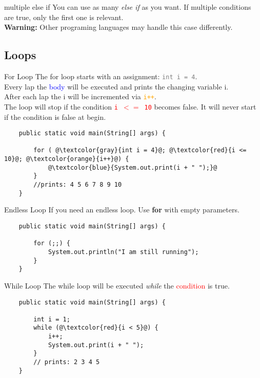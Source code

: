 \begin{frame}{multiple else if}
	You can use as many \emph{else if} as you want.
	If multiple conditions are true, only the first one is relevant. \\
	\vfill
	\textbf{Warning: } Other programing languages may handle this case differently.
\end{frame}

\subsection{Loops}
\begin{frame}[fragile]{For Loop}
	The for loop starts with an assignment: \textcolor{gray}{\texttt{int i = 4}}. \\
	Every lap the \textcolor{blue}{body} will be executed and prints the changing variable i. \\
	After each lap the i will be incremented via \textcolor{orange}{\texttt{i++}}. \\
	The loop will stop if the condition \textcolor{red}{\texttt{i $<=$ 10}} becomes false. 
	It will never start if the condition is false at begin.
	\begin{lstlisting}
	public static void main(String[] args) {
	
	    for ( @\textcolor{gray}{int i = 4}@; @\textcolor{red}{i <= 10}@; @\textcolor{orange}{i++}@) {
	        @\textcolor{blue}{System.out.print(i + " ");}@   
	    }
	    //prints: 4 5 6 7 8 9 10
	}
	\end{lstlisting}
\end{frame}

\begin{frame}[fragile]{Endless Loop}
	If you need an endless loop. Use \textbf{for} with empty parameters.
	\begin{lstlisting}
	public static void main(String[] args) {
	
	    for (;;) {
	        System.out.println("I am still running");
	    }
	}
	\end{lstlisting}
\end{frame}

\begin{frame}[fragile]{While Loop}
	The while loop will be executed \emph{while} the \textcolor{red}{condition} is true.
	\begin{lstlisting}
	public static void main(String[] args) {
	
	    int i = 1;
	    while (@\textcolor{red}{i < 5}@) {
	        i++;
	        System.out.print(i + " ");
	    }
	    // prints: 2 3 4 5
	}
	\end{lstlisting}
\end{frame}

